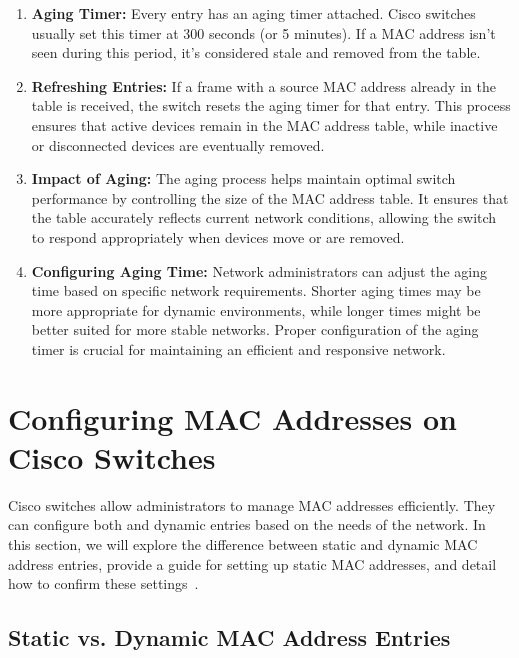 \documentclass[11pt,a4paper]{article}
\begin{document}
\begin{enumerate}

    \item \textbf{Aging Timer:} Every entry has an aging timer attached. Cisco switches usually set this timer at 300 seconds (or 5 minutes). If a MAC address isn’t seen during this period, it's considered stale and removed from the table.

\item \textbf{Refreshing Entries:} If a frame with a source MAC address already in the table is received, the switch resets the aging timer for that entry. This process ensures that active devices remain in the MAC address table, while inactive or disconnected devices are eventually removed.

\item \textbf{Impact of Aging:} The aging process helps maintain optimal switch performance by controlling the size of the MAC address table. It ensures that the table accurately reflects current network conditions, allowing the switch to respond appropriately when devices move or are removed.

\item \textbf{Configuring Aging Time:} Network administrators can adjust the aging time based on specific network requirements. Shorter aging times may be more appropriate for dynamic environments, while longer times might be better suited for more stable networks. Proper configuration of the aging timer is crucial for maintaining an efficient and responsive network.
\end{enumerate}

\section*{Configuring MAC Addresses on Cisco Switches}

Cisco switches allow administrators to manage MAC addresses efficiently. They can configure both and dynamic entries based on the needs of the network. In this section, we will explore the difference between static and dynamic MAC address entries, provide a guide for setting up static MAC addresses, and detail how to confirm these settings~\cite{Static-vs-Dynamic-MAC}.


\subsection*{Static vs. Dynamic MAC Address Entries}
\end{document}
